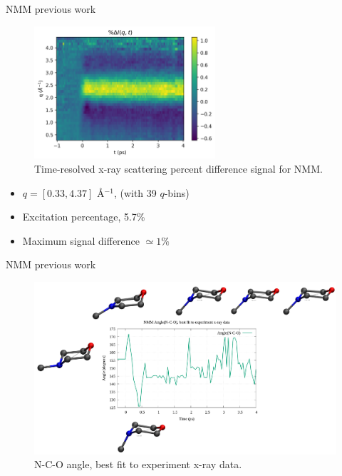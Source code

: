 \documentclass{beamer}
\begin{document}
\begin{frame}{NMM previous work}
	\begin{figure}[H]
		\centering
		\includegraphics[width=0.6\textwidth]{NMM_exp_2Dplot.png}
		\caption{Time-resolved x-ray scattering percent difference signal for NMM.}
		\label{fig:nmm-2dplot}
	\end{figure}
\vspace{-5mm}
	\begin{itemize}
		\item $q = [0.33, 4.37] $ \AA$^{-1}$, (with 39 $q$-bins)
		\item Excitation percentage, 5.7\%
		\item Maximum signal difference $\simeq 1\%$
	\end{itemize}
\end{frame}

\begin{frame}{NMM previous work}
	\begin{figure}[H]
	\centering
		\includegraphics[width=\textwidth]{geomovie_ppt_slide.png}
		\caption{N-C-O angle, best fit to experiment x-ray data.}
		\label{fig:geomovie-ppt-slide}
	\end{figure}

\end{frame}
\end{document}
